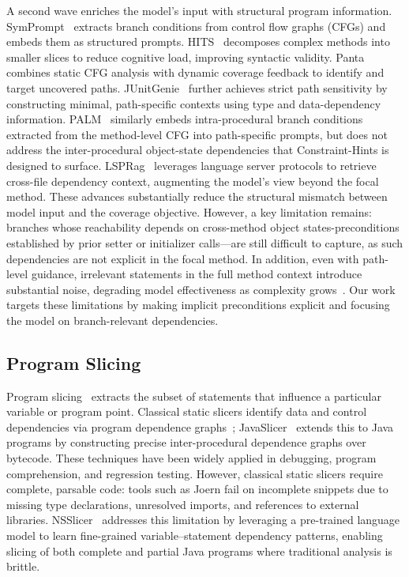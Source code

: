 A second wave enriches the model's input with structural program information. SymPrompt~\cite{ryan2024} extracts branch conditions from control flow graphs (CFGs) and embeds them as structured prompts. HITS~\cite{wang2024c} decomposes complex methods into smaller slices to reduce cognitive load, improving syntactic validity. Panta~\cite{gu2025a} combines static CFG analysis with dynamic coverage feedback to identify and target uncovered paths. JUnitGenie~\cite{liao2025} further achieves strict path sensitivity by constructing minimal, path-specific contexts using type and data-dependency information. PALM~\cite{chu2025palm} similarly embeds intra-procedural branch conditions extracted from the method-level CFG into path-specific prompts, but does not address the inter-procedural object-state dependencies that Constraint-Hints is designed to surface. LSPRag~\cite{GoLSPRAG2026icse} leverages language server protocols to retrieve cross-file dependency context, augmenting the model's view beyond the focal method. These advances substantially reduce the structural mismatch between model input and the coverage objective. However, a key limitation remains: branches whose reachability depends on cross-method object states-preconditions established by prior setter or initializer calls---are still difficult to capture, as such dependencies are not explicit in the focal method. In addition, even with path-level guidance, irrelevant statements in the full method context introduce substantial noise, degrading model effectiveness as complexity grows~\cite{du2025contextlengthhurtsllm,wang2026intelligencedegradationlongcontextllms}. Our work targets these limitations by making implicit preconditions explicit and focusing the model on branch-relevant dependencies.

\subsection{Program Slicing}

Program slicing~\cite{weiser1984,tip1995} extracts the subset of statements that influence a particular variable or program point. Classical static slicers identify data and control dependencies via program dependence graphs~\cite{ferrante1987}; JavaSlicer~\cite{JavaSlicer} extends this to Java programs by constructing precise inter-procedural dependence graphs over bytecode. These techniques have been widely applied in debugging, program comprehension, and regression testing. However, classical static slicers require complete, parsable code: tools such as Joern fail on incomplete snippets due to missing type declarations, unresolved imports, and references to external libraries. NSSlicer~\cite{yadavally2024} addresses this limitation by leveraging a pre-trained language model to learn fine-grained variable--statement dependency patterns, enabling slicing of both complete and partial Java programs where traditional analysis is brittle.


